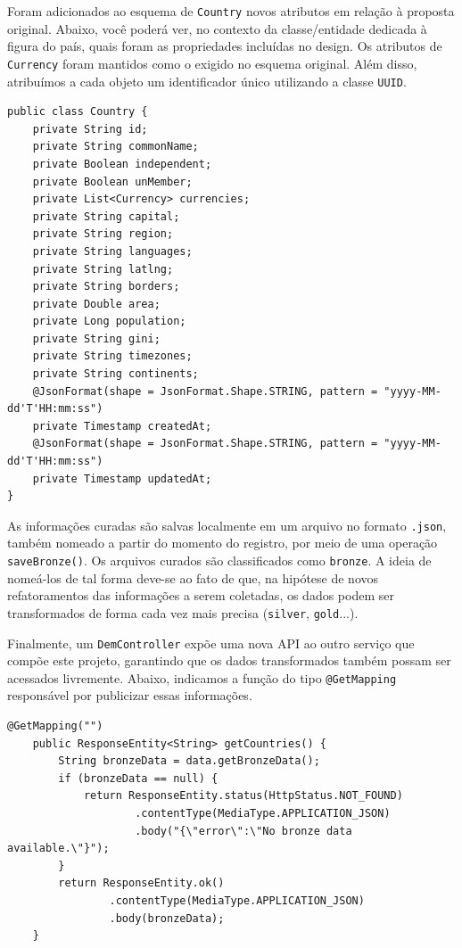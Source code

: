\documentclass[12pt]{article}
\begin{document}
\quad Foram adicionados ao esquema de \texttt{Country} novos atributos em relação à proposta original. Abaixo, você poderá ver, no contexto da classe/entidade dedicada à figura do país, quais foram as propriedades incluídas no design. Os atributos de \texttt{Currency} foram mantidos como o exigido no esquema original. Além disso, atribuímos a cada objeto um identificador único utilizando a classe \texttt{UUID}.

\begin{lstlisting}[style=vscode]
public class Country {
    private String id;
    private String commonName;
    private Boolean independent;
    private Boolean unMember;
    private List<Currency> currencies;
    private String capital;
    private String region;
    private String languages;
    private String latlng;
    private String borders;
    private Double area;
    private Long population;
    private String gini;
    private String timezones;
    private String continents;
    @JsonFormat(shape = JsonFormat.Shape.STRING, pattern = "yyyy-MM-dd'T'HH:mm:ss")
    private Timestamp createdAt;
    @JsonFormat(shape = JsonFormat.Shape.STRING, pattern = "yyyy-MM-dd'T'HH:mm:ss")
    private Timestamp updatedAt;
}
\end{lstlisting}

\quad As informações curadas são salvas localmente em um arquivo no formato \texttt{.json}, também nomeado a partir do momento do registro, por meio de uma operação \texttt{saveBronze()}. Os arquivos curados são classificados como \texttt{bronze}. A ideia de nomeá-los de tal forma deve-se ao fato de que, na hipótese de novos refatoramentos das informações a serem coletadas, os dados podem ser transformados de forma cada vez mais precisa (\texttt{silver}, \texttt{gold}...).

\quad Finalmente, um \texttt{DemController} expõe uma nova API ao outro serviço que compõe este projeto, garantindo que os dados transformados também possam ser acessados livremente. Abaixo, indicamos a função do tipo \texttt{@GetMapping} responsável por publicizar essas informações.

\begin{lstlisting}[style=vscode]
@GetMapping("")
    public ResponseEntity<String> getCountries() {
        String bronzeData = data.getBronzeData();
        if (bronzeData == null) {
            return ResponseEntity.status(HttpStatus.NOT_FOUND)
                    .contentType(MediaType.APPLICATION_JSON)
                    .body("{\"error\":\"No bronze data available.\"}");
        }
        return ResponseEntity.ok()
                .contentType(MediaType.APPLICATION_JSON)
                .body(bronzeData);
    }
\end{lstlisting}
\end{document}
